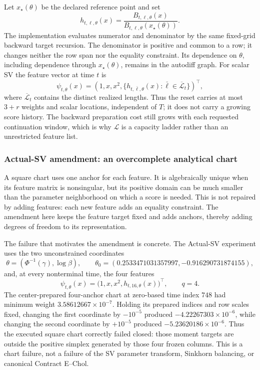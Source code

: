Let \(x_\star(\theta)\) be the declared reference point and set
\begin{equation}
\label{eq:bf-ledh-progressive-continuation-stabilized-mark}
  h_{t,\ell,\theta}(x)
  =\frac{B_{t,\ell,\theta}(x)}
         {B_{t,\ell,\theta}(x_\star(\theta))}.
\end{equation}
The implementation evaluates numerator and denominator by the same fixed-grid
backward target recursion.  The denominator is positive and common to a row;
it changes neither the row span nor the equality constraint.  Its dependence
on \(\theta\), including dependence through \(x_\star(\theta)\), remains in the
autodiff graph.  For scalar SV the feature vector at time \(t\) is
\begin{equation}
\label{eq:bf-ledh-progressive-sv-feature-vector}
  \psi_{t,\theta}(x)
  =\left(1,x,x^2,
    \{h_{t,\bar\ell,\theta}(x):
       \bar\ell\in\overline{\mathcal L}_t\}\right)^\top,
\end{equation}
where \(\overline{\mathcal L}_t\) contains the distinct realized lengths.
Thus the reset carries at most \(3+r\) weights and scalar locations, independent
of \(T\); it does not carry a growing score history.  The backward preparation
cost still grows with each requested continuation window, which is why
\(\mathcal L\) is a capacity ladder rather than an unrestricted feature list.

\subsubsection{Actual-SV amendment: an overcomplete analytical chart}
\label{sec:bf-ledh-actual-sv-overcomplete-chart}

A square chart uses one anchor for each feature.  It is algebraically unique
when its feature matrix is nonsingular, but its positive domain can be much
smaller than the parameter neighborhood on which a score is needed.  This is
not repaired by adding features: each new feature adds an equality constraint.
The amendment here keeps the feature target fixed and adds anchors, thereby
adding degrees of freedom to its representation.

The failure that motivates the amendment is concrete.  The Actual-SV
experiment uses the two unconstrained coordinates
\[
  \theta=(\Phi^{-1}(\gamma),\log\beta),\qquad
  \theta_0=(0.2533471031357997,-0.916290731874155),
\]
and, at every nonterminal time, the four features
\begin{equation}
\label{eq:bf-ledh-actual-sv-four-features}
  \psi_{t,\theta}(x)
  =\bigl(1,x,x^2,h_{t,16,\theta}(x)\bigr)^\top,
  \qquad q=4.
\end{equation}
The center-prepared four-anchor chart at zero-based time index \(748\) had
minimum weight \(3.58612667\times10^{-7}\).  Holding its prepared indices and
row scales fixed, changing the first coordinate by \(-10^{-5}\) produced
\(-4.22267303\times10^{-6}\), while changing the second coordinate by
\(+10^{-5}\) produced \(-5.23620186\times10^{-6}\).  Thus the executed square
chart correctly failed closed: those moment targets are outside the positive
simplex generated by those four frozen columns.  This is a chart failure, not
a failure of the SV parameter transform, Sinkhorn balancing, or canonical
Contract E--Chol.

